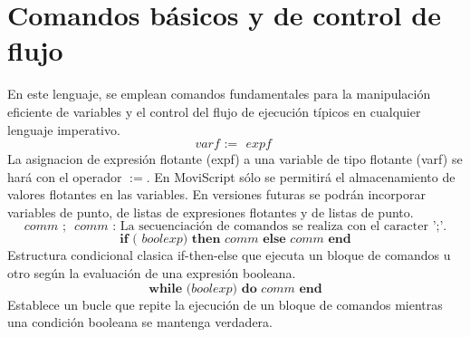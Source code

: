 \documentclass[11pt]{scrartcl}
\begin{document}
\section{Comandos b\'asicos y de control de flujo}
En este lenguaje, se emplean comandos fundamentales para la 
manipulación eficiente de variables y el control del flujo de ejecución t\'ipicos
en cualquier lenguaje imperativo.\newline
\begin{equation*}
    \textit{varf} \textbf{ := } \textit{ expf }
\end{equation*}
La asignacion de expresi\'on flotante (expf) a una variable de tipo flotante (varf) se har\'a con el 
operador $:=$. En MoviScript s\'olo se permitir\'a el almacenamiento de valores flotantes 
en las variables. En versiones futuras se podr\'an incorporar variables de punto, de listas de 
expresiones flotantes y de listas de punto.
\begin{equation*}
    \textit{comm} \textbf{ ; } \textit{ comm }
    \text {: La secuenciaci\'on de comandos se realiza con el caracter ';'.}
\end{equation*}
\begin{equation*}
\textbf{ if ( } \textit{boolexp} \textbf{) then } \textit{comm} \textbf{ else } \textit{comm} \textbf{ end }
\end{equation*}
Estructura condicional clasica if-then-else que ejecuta un bloque de comandos u otro 
seg\'un la evaluación de una expresión booleana.
\newline
\begin{equation*}
\textbf{ while (} \textit{boolexp} \textbf{) do } \textit{comm} \textbf{ end }
\end{equation*}
Establece un bucle que repite la ejecuci\'on de un bloque de
comandos mientras una condici\'on booleana se mantenga verdadera.
\end{document}
